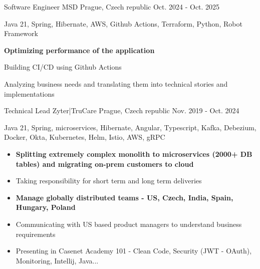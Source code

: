 

\begin{cventries}

    \cventry
    {Software Engineer} %
    {MSD} %
    {Prague, Czech republic} %
    {Oct. 2024 - Oct. 2025} %
    {
        \hspace{15pt} \faHammer Java 21, Spring, Hibernate, AWS, Github Actions, Terraform, Python, Robot Framework
        \begin{itemize}
            \item {\textbf{{Optimizing performance of the application}}
            \item Building CI/CD using Github Actions}
            \item {Analyzing business needs and translating them into technical stories and implementations}
        \end{itemize}
    }
    \cventry
    {Technical Lead} %
    {Zyter|TruCare} %
    {Prague, Czech republic} %
    {Nov. 2019 - Oct. 2024} %
    {
        \hspace{15pt} \faHammer Java 21, Spring, microservices, Hibernate, Angular, Typescript, Kafka, Debezium, Docker, Okta, Kubernetes, Helm, Istio, AWS, gRPC
        \begin{itemize}
            \item {\textbf{Splitting extremely complex monolith to microservices (2000+ DB tables) and migrating on-prem customers to cloud}}
            \item {Taking responsibility for short term and long term deliveries}
            \item {\textbf{Manage globally distributed teams - US, Czech, India, Spain, Hungary, Poland}}
            \item {Communicating with US based product managers to understand business requirements}
            \item {Presenting in Casenet Academy 101 - Clean Code, Security (JWT - OAuth), Monitoring, Intellij, Java...}
        \end{itemize}
    }


\end{cventries}
